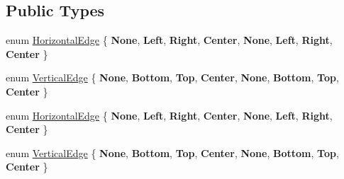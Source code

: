 \subsection*{Public Types}
\begin{DoxyCompactItemize}
\item 
enum \hyperlink{classui_1_1LayoutComponent_aaa61687a8a4e98f525413e1f0cfacf18}{Horizontal\+Edge} \{ \newline
{\bfseries None}, 
{\bfseries Left}, 
{\bfseries Right}, 
{\bfseries Center}, 
\newline
{\bfseries None}, 
{\bfseries Left}, 
{\bfseries Right}, 
{\bfseries Center}
 \}
\item 
enum \hyperlink{classui_1_1LayoutComponent_a186978dac32f26bf251942e893999c8f}{Vertical\+Edge} \{ \newline
{\bfseries None}, 
{\bfseries Bottom}, 
{\bfseries Top}, 
{\bfseries Center}, 
\newline
{\bfseries None}, 
{\bfseries Bottom}, 
{\bfseries Top}, 
{\bfseries Center}
 \}
\item 
enum \hyperlink{classui_1_1LayoutComponent_aaa61687a8a4e98f525413e1f0cfacf18}{Horizontal\+Edge} \{ \newline
{\bfseries None}, 
{\bfseries Left}, 
{\bfseries Right}, 
{\bfseries Center}, 
\newline
{\bfseries None}, 
{\bfseries Left}, 
{\bfseries Right}, 
{\bfseries Center}
 \}
\item 
enum \hyperlink{classui_1_1LayoutComponent_a186978dac32f26bf251942e893999c8f}{Vertical\+Edge} \{ \newline
{\bfseries None}, 
{\bfseries Bottom}, 
{\bfseries Top}, 
{\bfseries Center}, 
\newline
{\bfseries None}, 
{\bfseries Bottom}, 
{\bfseries Top}, 
{\bfseries Center}
 \}
\end{DoxyCompactItemize}
